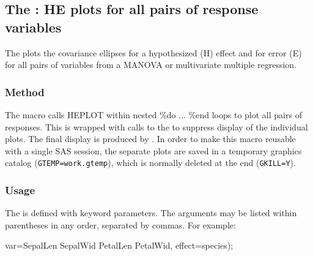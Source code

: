 
\subsection{The : HE plots for all pairs of response variables}\label{mac:hemat}

The  plots the covariance ellipses for a hypothesized (H)
effect and for error (E) for all pairs of variables from a MANOVA
or multivariate multiple regression.

\subsubsection*{Method}

The macro calls HEPLOT within nested \%do ... \%end loops to plot all
pairs of responses.  This is wrapped with calls to the  
to suppress display of the individual plots.  The final display is
produced by .  In order to make this macro reusable with
a single SAS session, the separate plots are saved in a temporary
graphics catalog (\texttt{GTEMP=work.gtemp}), which is normally deleted at the end
(\texttt{GKILL=Y}).

\subsubsection*{Usage}

The  is defined with keyword parameters.
The arguments may be listed within parentheses in any order, separated
by commas. For example:

\begin{listing}
    var=SepalLen SepalWid PetalLen PetalWid,
    effect=species);
\end{listing}

